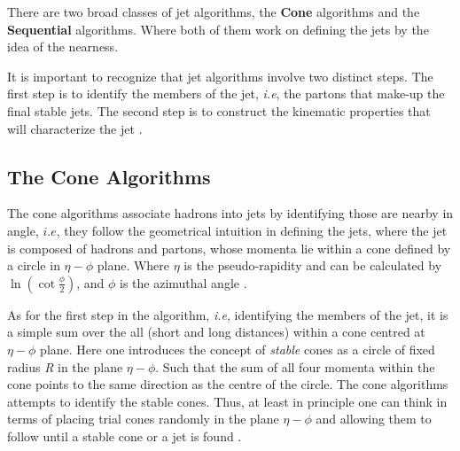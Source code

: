 There are two broad classes of jet algorithms, the \textbf{Cone} algorithms and the \textbf{Sequential} algorithms. Where both of them work on defining the jets by the idea of the nearness.

It is important to recognize that jet algorithms involve two distinct steps. The first step is to identify the members of the jet, \textit{i.e}, the partons that make-up the final stable jets. The second step is to construct the kinematic properties that will characterize the jet \citep{Berger:2002jt}.
  
\subsection{The Cone Algorithms}
The cone algorithms associate hadrons into jets by identifying those are nearby in angle, $i.e$, they follow the geometrical intuition in defining the jets, where the jet is composed of hadrons and partons, whose momenta lie within a cone defined by  a circle in $\eta-\phi$ plane. Where $\eta$ is the pseudo-rapidity and can be calculated by $\ln(\cot \frac{\phi}{2})$, and $\phi$ is the azimuthal angle \citep{Berger:2002jt}. 

As for the first step in the algorithm, \textit{i.e}, identifying the members of the jet, it is a simple sum over the all (short and long distances) within a cone centred at $\eta-\phi$ plane. Here one introduces the concept of \textit{stable} cones as a circle of fixed radius \textit{R} in the plane $\eta-\phi$. Such that the sum of all four momenta within the cone points to the same direction as the centre of the circle. The cone algorithms attempts to identify the stable cones. Thus, at least in principle one can think in terms of placing trial cones randomly in the plane $\eta-\phi$  and allowing them to follow until a stable cone or a jet is found \citep{Ellis:2007ib}.

     